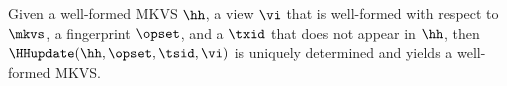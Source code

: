 


\begin{lemma}
\label{lem:hhupdate.welldefined}
Given a well-formed MKVS $\hh$, a view $\vi$ that is well-formed with respect to \( \mkvs \), a fingerprint \( \opset \), and a $\txid$ that does not appear in $\hh$, then $\HHupdate(\hh, \opset, \tsid, \vi)$ is uniquely determined and yields a well-formed MKVS.
\end{lemma}


                                                                                                         
